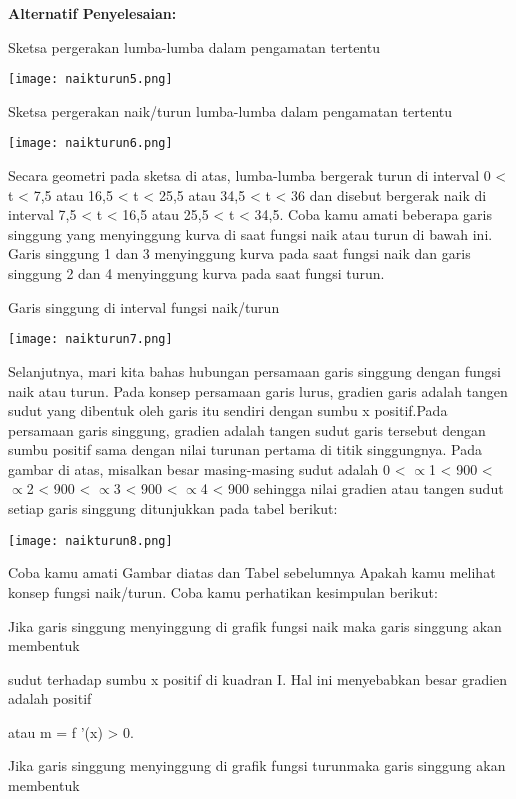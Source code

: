 \documentclass[11pt,fleqn]{book} %
\begin{document}
\textbf{Alternatif Penyelesaian:}

Sketsa pergerakan lumba-lumba dalam pengamatan tertentu

\texttt{[image: naikturun5.png]}

Sketsa pergerakan naik/turun lumba-lumba dalam pengamatan tertentu

\texttt{[image: naikturun6.png]}

Secara geometri pada sketsa di atas, lumba-lumba bergerak turun di interval 0 < t < 7,5 atau 16,5 < t < 25,5 atau 34,5 < t < 36 dan disebut bergerak naik di interval 7,5 < t < 16,5 atau 25,5 < t < 34,5.
Coba kamu amati beberapa garis singgung yang menyinggung kurva di saat fungsi naik atau turun di bawah ini. Garis singgung 1 dan 3 menyinggung kurva pada saat fungsi naik dan garis singgung 2 dan 4 menyinggung kurva pada saat fungsi turun.

Garis singgung di interval fungsi naik/turun

\texttt{[image: naikturun7.png]}

Selanjutnya, mari kita bahas hubungan persamaan garis singgung dengan fungsi naik atau turun. Pada konsep
persamaan garis lurus, gradien garis adalah tangen sudut yang dibentuk oleh garis itu sendiri dengan sumbu x positif.Pada persamaan garis singgung, gradien adalah tangen sudut garis tersebut dengan sumbu positif sama dengan nilai turunan pertama di titik singgungnya. Pada gambar di atas, misalkan besar masing-masing sudut adalah 0 < $\propto $1 < 900 < $\propto $2 < 900 < $\propto $3 < 900 < $\propto $4 < 900 sehingga nilai
gradien atau tangen sudut setiap garis singgung ditunjukkan pada tabel berikut:

\begin{center}
\texttt{[image: naikturun8.png]}
\end{center}

Coba kamu amati Gambar diatas dan Tabel sebelumnya Apakah kamu melihat konsep fungsi naik/turun. Coba kamu perhatikan kesimpulan berikut:

Jika garis singgung menyinggung di grafik fungsi naik maka garis singgung akan membentuk 

sudut terhadap sumbu x positif di kuadran I. Hal ini menyebabkan besar gradien adalah positif 

atau m = f '(x) > 0.

Jika garis singgung menyinggung di grafik fungsi turunmaka garis singgung akan membentuk 
\end{document}
